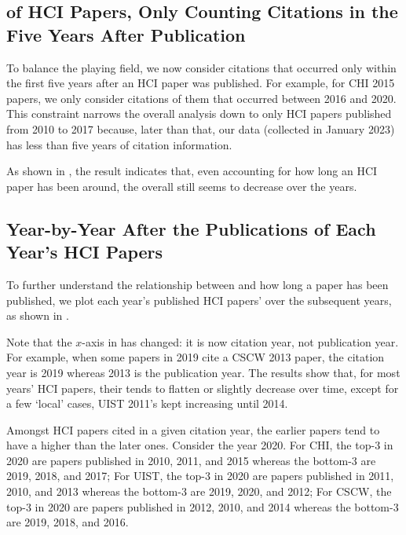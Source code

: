 \subsection{\xin of HCI Papers, Only Counting Citations in the Five Years After Publication}
To balance the playing field, we now consider citations that occurred only within the first five years after an HCI paper was published.
For example, for CHI 2015 papers, we only consider citations of them that occurred between 2016 and 2020.
This constraint narrows the overall analysis down to only HCI papers published from 2010 to 2017 because, later than that, our data (collected in January 2023) has less than five years of citation information.

As shown in , the result indicates that, even accounting for how long an HCI paper has been around, the overall \xin still seems to decrease over the years.



\subsection{\xin Year-by-Year After the Publications of Each Year's HCI Papers}

To further understand the relationship between \xin and how long a paper has been published, we plot each year's published HCI papers' \xin over the subsequent years, as shown in .

Note that the $x$-axis in  has changed: it is now citation year, not publication year. For example, when some papers in 2019 cite a CSCW 2013 paper, the citation year is 2019 whereas 2013 is the publication year.
The results show that, for most years' HCI papers, their \xin tends to flatten or slightly decrease over time, except for a few `local' cases, \eg UIST 2011's \xin kept increasing until 2014.

Amongst HCI papers cited in a given citation year, the earlier papers tend to have a higher \xin than the later ones. 
Consider the year 2020. 
For CHI, the top-3 \xin in 2020 are papers published in 2010, 2011, and 2015 whereas the bottom-3 are 2019, 2018, and 2017;
For UIST, the top-3 \xin in 2020 are papers published in 2011, 2010, and 2013 whereas the bottom-3 are 2019, 2020, and 2012;
For CSCW, the top-3 \xin in 2020 are papers published in 2012, 2010, and 2014 whereas the bottom-3 are 2019, 2018, and 2016.

